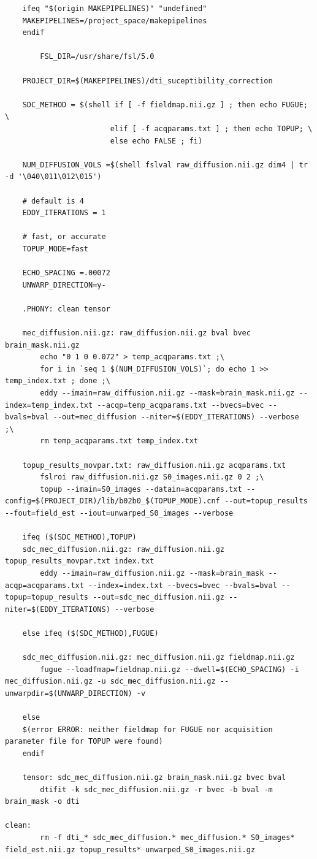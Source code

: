 \begin{lstlisting}
	ifeq "$(origin MAKEPIPELINES)" "undefined"
	MAKEPIPELINES=/project_space/makepipelines
	endif

        FSL_DIR=/usr/share/fsl/5.0

	PROJECT_DIR=$(MAKEPIPELINES)/dti_suceptibility_correction

	SDC_METHOD = $(shell if [ -f fieldmap.nii.gz ] ; then echo FUGUE; \
	                    elif [ -f acqparams.txt ] ; then echo TOPUP; \
	                    else echo FALSE ; fi)

	NUM_DIFFUSION_VOLS =$(shell fslval raw_diffusion.nii.gz dim4 | tr -d '\040\011\012\015')

	# default is 4
	EDDY_ITERATIONS = 1

	# fast, or accurate
	TOPUP_MODE=fast

	ECHO_SPACING =.00072
	UNWARP_DIRECTION=y-

	.PHONY: clean tensor

	mec_diffusion.nii.gz: raw_diffusion.nii.gz bval bvec brain_mask.nii.gz
		echo "0 1 0 0.072" > temp_acqparams.txt ;\
		for i in `seq 1 $(NUM_DIFFUSION_VOLS)`; do echo 1 >> temp_index.txt ; done ;\
		eddy --imain=raw_diffusion.nii.gz --mask=brain_mask.nii.gz --index=temp_index.txt --acqp=temp_acqparams.txt --bvecs=bvec --bvals=bval --out=mec_diffusion --niter=$(EDDY_ITERATIONS) --verbose  ;\
		rm temp_acqparams.txt temp_index.txt

	topup_results_movpar.txt: raw_diffusion.nii.gz acqparams.txt
		fslroi raw_diffusion.nii.gz S0_images.nii.gz 0 2 ;\
		topup --imain=S0_images --datain=acqparams.txt --config=$(PROJECT_DIR)/lib/b02b0_$(TOPUP_MODE).cnf --out=topup_results --fout=field_est --iout=unwarped_S0_images --verbose

	ifeq ($(SDC_METHOD),TOPUP)
	sdc_mec_diffusion.nii.gz: raw_diffusion.nii.gz topup_results_movpar.txt index.txt
		eddy --imain=raw_diffusion.nii.gz --mask=brain_mask --acqp=acqparams.txt --index=index.txt --bvecs=bvec --bvals=bval --topup=topup_results --out=sdc_mec_diffusion.nii.gz --niter=$(EDDY_ITERATIONS) --verbose

	else ifeq ($(SDC_METHOD),FUGUE)

	sdc_mec_diffusion.nii.gz: mec_diffusion.nii.gz fieldmap.nii.gz
		fugue --loadfmap=fieldmap.nii.gz --dwell=$(ECHO_SPACING) -i mec_diffusion.nii.gz -u sdc_mec_diffusion.nii.gz --unwarpdir=$(UNWARP_DIRECTION) -v

	else
	$(error ERROR: neither fieldmap for FUGUE nor acquisition parameter file for TOPUP were found)
	endif

	tensor: sdc_mec_diffusion.nii.gz brain_mask.nii.gz bvec bval
		dtifit -k sdc_mec_diffusion.nii.gz -r bvec -b bval -m brain_mask -o dti

clean:
		rm -f dti_* sdc_mec_diffusion.* mec_diffusion.* S0_images* field_est.nii.gz topup_results* unwarped_S0_images.nii.gz

\end{lstlisting}

